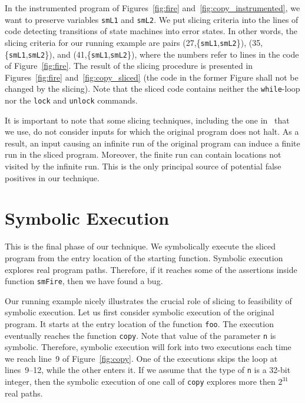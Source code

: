 \documentclass[10pt]{llncs}
\begin{document}
In the instrumented program of Figures~\ref{fig:fire}
and~\ref{fig:copy_instrumented}, we want to preserve variables \texttt{smL1}
and \texttt{smL2}. We put slicing criteria into the lines of code detecting
transitions of state machines into error states. In other words, the slicing
criteria for our running example are pairs
(27,\{\texttt{smL1},\texttt{smL2}\}), (35,\{\texttt{smL1},\texttt{smL2}\}), and
(41,\{\texttt{smL1},\texttt{smL2}\}), where the numbers refer to lines in the
code of Figure~\ref{fig:fire}. The result of the slicing procedure is
presented in Figures~\ref{fig:fire} and~\ref{fig:copy_sliced} (the code in
the former Figure shall not be changed by the slicing). Note that the sliced
code contains neither the \texttt{while}-loop nor the \texttt{lock} and
\texttt{unlock} commands.

It is important to note that some slicing techniques, including the one
in~\cite{Wei84} that we use, do not consider inputs for which the original
program does not halt.
As a result, an input causing an infinite run of the original program can
induce a finite run in the sliced program. Moreover, the finite run can
contain locations not visited by the infinite run.
This is the only principal source of potential false positives in our
technique.


\section{Symbolic Execution} \label{sec:symexe}

This is the final phase of our technique. We symbolically execute the sliced
program from the entry location of the starting function. Symbolic execution
explores real program paths. Therefore, if it reaches some of the assertions
inside function \texttt{smFire}, then we have found a bug.

Our running example nicely illustrates the crucial role of slicing to
feasibility of symbolic execution. Let us first consider symbolic execution
of the original program. It starts at the entry location of the function
\texttt{foo}. The execution eventually reaches the function
\texttt{copy}. Note that value of the parameter \texttt{n} is
symbolic. Therefore, symbolic execution will fork into two executions each
time we reach line~9 of Figure~\ref{fig:copy}. One of the executions skips
the loop at lines~9--12, while the other enters it. If we assume that the
type of \texttt{n} is a 32-bit integer, then the symbolic execution of one
call of \texttt{copy} explores more then $2^{31}$ real paths.
\end{document}

